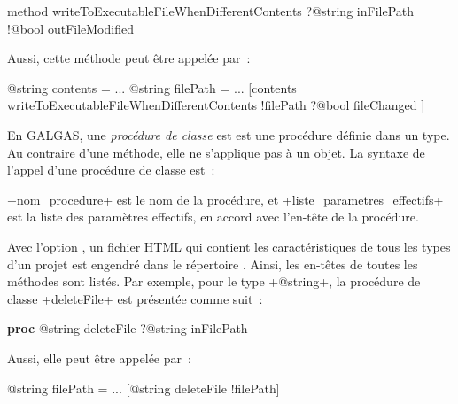 \begin{galgas4}
method writeToExecutableFileWhenDifferentContents
  ?@string inFilePath
  !@bool outFileModified
\end{galgas4}


Aussi, cette méthode peut être appelée par~:
\begin{galgas4}
@string contents = ...
@string filePath = ...
[contents writeToExecutableFileWhenDifferentContents
  !filePath
  ?@bool fileChanged
]
\end{galgas4}
















En GALGAS, une \emph{procédure de classe} est est une procédure définie dans un type. Au contraire d'une méthode, elle ne s'applique pas à un objet. La syntaxe de l'appel d'une procédure de classe est~:
\begin{galgas4}
\end{galgas4}

\ggsq+nom_procedure+ est le nom de la procédure, et \ggsq+liste_parametres_effectifs+ est la liste des paramètres effectifs, en accord avec l'en-tête de la procédure.

Avec l'option , un fichier HTML qui contient les caractéristiques de tous les types d'un projet est engendré dans le répertoire . Ainsi, les en-têtes de toutes les méthodes sont listés. Par exemple, pour le type \ggsq+@string+, la procédure de classe \ggsq+deleteFile+ est présentée comme suit~:

{\noindent\ttfamily
\textbf{proc} @string deleteFile ?@string inFilePath\\
}

Aussi, elle peut être appelée par~:
\begin{galgas4}
@string filePath = ...
[@string deleteFile !filePath]
\end{galgas4}











